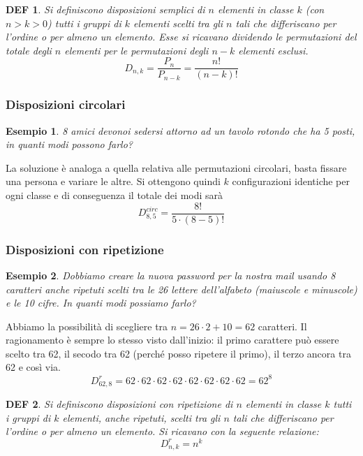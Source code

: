\documentclass{article}     %
\newtheorem*{definition}{DEF}
\newtheorem{ex}{Esempio}[section]
\begin{document}
            \begin{definition}
                Si definiscono disposizioni semplici di $n$ elementi in classe $k$ (con $n>k>0$) tutti i gruppi di $k$ elementi scelti tra gli $n$ tali che differiscano per l'ordine o per almeno un elemento. Esse si ricavano dividendo le permutazioni del totale degli $n$ elementi per le permutazioni degli $n-k$ elementi esclusi. \[D_{n,k}=\frac{P_n}{P_{n-k}}=\frac{n!}{(n-k)!}\]
            \end{definition}
            
            \subsubsection{Disposizioni circolari}
            \begin{ex}
                8 amici devonoi sedersi attorno ad un tavolo rotondo che ha 5 posti, in quanti modi possono farlo?
                
            \end{ex}
            La soluzione è analoga a quella relativa alle permutazioni circolari, basta fissare una persona e variare le altre. Si ottengono quindi $k$ configurazioni identiche per ogni classe e di conseguenza il totale dei modi sarà
            \[D_{8,5}^{circ}=\frac{8!}{5\cdot(8-5)!}\]
            \subsubsection{Disposizioni con ripetizione}
            \begin{ex}
                Dobbiamo creare la nuova password per la nostra mail usando 8 caratteri anche ripetuti scelti tra le 26 lettere dell'alfabeto (maiuscole e minuscole) e le 10 cifre. In quanti modi possiamo farlo?
                
            \end{ex}
            Abbiamo la possibilità di scegliere tra $n=26\cdot2+10=62$ caratteri. Il ragionamento è sempre lo stesso visto dall'inizio: il primo carattere può essere scelto tra 62, il secodo tra 62 (perché posso ripetere il primo), il terzo ancora tra 62 e così via. 
            \[D_{62,8}^r=62\cdot62\cdot62\cdot62\cdot62\cdot62\cdot62\cdot62=62^8\]

            \begin{definition}
                Si definiscono disposizioni con ripetizione di $n$ elementi in classe $k$  tutti i gruppi di $k$ elementi, anche ripetuti, scelti tra gli $n$ tali che differiscano per l'ordine o per almeno un elemento. Si ricavano con la seguente relazione: \[D^r_{n,k}=n^k\]
            \end{definition}
\end{document}
